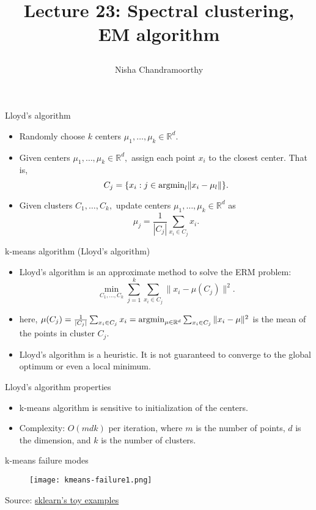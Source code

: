\documentclass[final]{beamer}
\title{\begin{huge}{Lecture 23: Spectral clustering, EM algorithm}\end{huge}} %
\author{Nisha Chandramoorthy} %
\begin{document}
\frame{\titlepage}

\begin{frame}{Lloyd's algorithm}
	\begin{itemize}
		\item Randomly choose $k$ centers $\mu_1, \ldots, \mu_k \in \mathbb{R}^d.$
		\pause
	\item Given centers $\mu_1, \ldots, \mu_k \in \mathbb{R}^d,$ assign each point $x_i$ to the closest center. That is, $$C_j = \{x_i: j \in {\rm arg min}_l \|x_i - \mu_{l}\|\}.$$
		\pause
	\item Given clusters $C_1, \ldots, C_k,$ update centers $\mu_1, \ldots, \mu_k \in \mathbb{R}^d$ as $$\mu_j = \frac{1}{|C_j|} \sum_{x_i \in C_j} x_i.$$
		
	\end{itemize}
\end{frame}
\begin{frame}{k-means algorithm (Lloyd's algorithm)}
	\begin{itemize}
		\item Lloyd's algorithm is an approximate method to solve the ERM problem: $$\min_{C_1, \ldots, C_k} \sum_{j=1}^k \sum_{x_i \in C_j} \|x_i - \mu(C_j)\|^2.$$
		\pause
		\item here, $\mu(C_j) = \frac{1}{|C_j|} \sum_{x_i \in C_j} x_i = {\rm argmin}_{\mu \in \mathbb{R}^d} \sum_{x_i \in C_j} \|x_i - \mu\|^2$ is the mean of the points in cluster $C_j.$
		\pause
		\item Lloyd's algorithm is a heuristic. It is not guaranteed to converge to the global optimum or even a local minimum.
	\end{itemize}
\end{frame}
\begin{frame}{Lloyd's algorithm properties}
	\begin{itemize}
		\item k-means algorithm is sensitive to initialization of the centers.
		\pause
		\item Complexity: $O(mdk)$ per iteration, where $m$ is the number of points, $d$ is the dimension, and $k$ is the number of clusters.	
	\end{itemize}
\end{frame}
\begin{frame}{k-means failure modes}
	\begin{figure}
		\texttt{[image: kmeans-failure1.png]}
\end{figure}
	Source: \href{https://scikit-learn.org/stable/auto_examples/cluster/plot_kmeans_assumptions.html\#sphx-glr-auto-examples-cluster-plot-kmeans-assumptions-py}{sklearn's toy examples}
\end{frame}
\end{document}
